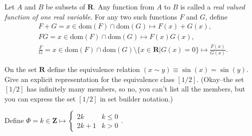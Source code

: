 \documentclass[12pt,fleqn,answers]{exam}
\newcommand{\reals}{\mathbf{R}}
\newcommand{\dom}{\mbox{dom}}
\newcommand{\integers}{\mathbf{Z}}
\begin{document}
\begin{questions} 

\question Let $A$ and $B$ be subsets of $\reals$. Any function
from $A$ to $B$ is called a \emph{real valued function of one real variable}.
For any two such functions $F$ and $G$, define
\begin{align*}
&F+G = x \in \dom(F) \cap \dom(G) \mapsto F(x) + G(x),\\
&F G = x \in \dom(F) \cap \dom(G) \mapsto F(x)  G(x),\\
&\frac{F}{G} = x \in \dom(F) \cap \dom(G) \setminus 
\{x \in \reals | G(x) = 0 \} \mapsto \frac{F(x)}{G(x)}.
\end{align*}




\question On the set $\reals$ define the equivalence relation $(x \sim y) \equiv
\sin(x) = \sin(y)$. Give an explicit representation for the equivalence class $[1/2]$.
(Okay--the set $[1/2]$ has infinitely many members, so no, you can't list all the
members, but you can express the set $[1/2]$ in set builder notation.)


\question Define $\Phi = k \in \integers \mapsto \begin{cases} 2k & k \leq 0 \\
    2 k + 1 & k > 0 \end{cases}$.



\end{questions}
\end{document}
